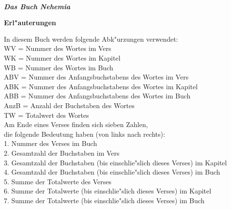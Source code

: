 \documentclass[a4paper,10pt,landscape]{article}
\renewcommand{\sectionmark}[1]{\markright{{#1}}}
\renewcommand{\section}[3]{\begin{center}{ \huge {\bf \textsl{{#1}}\\ \textcolor{red}{\textsl{{#2}}}}}\end{center}
\sectionmark{{#3}}}
\begin{document}

\section{\bigskip\bigskip\bigskip\bigskip\bigskip\bigskip\\Das Buch Nehemia}{}{Nehemia}	%


\bigskip				%

\newpage
\hphantom{x}
\bigskip\bigskip\bigskip\bigskip\bigskip\bigskip
\begin{center}{ \huge {\bf Erl"auterungen}}\end{center}

\medskip
In diesem Buch werden folgende Abk"urzungen verwendet:\\
WV = Nummer des Wortes im Vers\\
WK = Nummer des Wortes im Kapitel\\
WB = Nummer des Wortes im Buch\\
ABV = Nummer des Anfangsbuchstabens des Wortes im Vers\\
ABK = Nummer des Anfangsbuchstabens des Wortes im Kapitel\\
ABB = Nummer des Anfangsbuchstabens des Wortes im Buch\\
AnzB = Anzahl der Buchstaben des Wortes\\
TW = Totalwert des Wortes\\

\medskip
Am Ende eines Verses finden sich sieben Zahlen,\\
die folgende Bedeutung haben (von links nach rechts):\\
1. Nummer des Verses im Buch\\
2. Gesamtzahl der Buchstaben im Vers\\
3. Gesamtzahl der Buchstaben (bis einschlie"slich dieses Verses) im Kapitel\\
4. Gesamtzahl der Buchstaben (bis einschlie"slich dieses Verses) im Buch\\
5. Summe der Totalwerte des Verses\\
6. Summe der Totalwerte (bis einschlie"slich dieses Verses) im Kapitel\\
7. Summe der Totalwerte (bis einschlie"slich dieses Verses) im Buch\\
\end{document}
